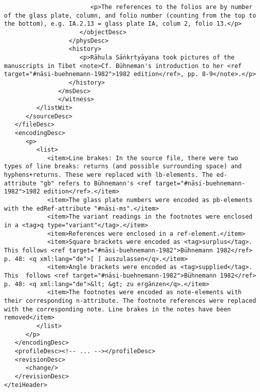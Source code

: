 \documentclass[article,12pt,a4paper]{memoir}%
\begin{document}
\begin{verbatim}
                        <p>The references to the folios are by number of the glass plate, column, and folio number (counting from the top to the bottom), e.g. IA.2.13 = glass plate IA, colum 2, folio 13.</p>
                     </objectDesc>
                  </physDesc>
                  <history>
                     <p>Rāhula Sāṅkṛtyāyana took pictures of the manuscripts in Tibet <note>Cf. Bühneman's introduction to her <ref target="#nāsi-buehnemann-1982">1982 edition</ref>, pp. 8-9</note>.</p>
                  </history>
               </msDesc>
	           </witness>
         </listWit>
      </sourceDesc>
   </fileDesc>
   <encodingDesc>
      <p>
         <list>
            <item>Line brakes: In the source file, there were two types of line breaks: returns (and possible surrounding space) and hyphens+returns. These were replaced with lb-elements. The ed-attribute "gb" refers to Bühnemann's <ref target="#nāsi-buehnemann-1982">1982 edition</ref>.</item>
            <item>The glass plate numbers were encoded as pb-elements with the edRef-attribute "#nāsi-ms".</item>
            <item>The variant readings in the footnotes were enclosed in a <tag>q type="variant"</tag>.</item>
            <item>References were enclosed in a ref-element.</item>
            <item>Square brackets were encoded as <tag>surplus</tag>. This follows <ref target="#nāsi-buehnemann-1982">Bühnemann 1982</ref> p. 48: <q xml:lang="de">[ ] auszulassen</q>.</item>
            <item>Angle brackets were encoded as <tag>supplied</tag>. This 	follows <ref target="#nāsi-buehnemann-1982">Bühnemann 1982</ref> p. 48: <q xml:lang="de">&lt; &gt; zu ergänzen</q>.</item>
            <item>The footnotes were encoded as note-elements with their corresponding n-attribute. The footnote references were replaced with the corresponding note. Line brakes in the notes have been removed</item>
         </list>
      </p>
   </encodingDesc>
   <profileDesc><!-- ... --></profileDesc>
   <revisionDesc>
      <change/>
   </revisionDesc>
</teiHeader>
	 \end{verbatim}
       
      \clearpage
      \begin{english}
      \printshorthands
      \printbibliography
      \end{english}
    
\end{document}
